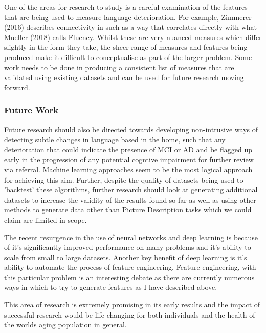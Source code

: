 \documentclass{article}
\begin{document}
\par
One of the areas for research to study is a careful examination of the features that are being used to measure language deterioration. For example, Zimmerer (2016) \cite{Zimmerer2016} describes connectivity in such as a way that correlates directly with what Mueller (2018) \cite{Mueller2018a} calls Fluency. Whilst these are very nuanced measures which differ slightly in the form they take, the sheer range of measures and features being produced make it difficult to conceptualise as part of the larger problem. Some work needs to be done in producing a consistent list of measures that are validated using existing datasets and can be used for future research moving forward. \newline
\par
\subsubsection{Future Work}
Future research should also be directed towards developing non-intrusive ways of detecting subtle changes in language based in the home, such that any deterioration that could indicate the presence of MCI or AD and be flagged up early in the progression of any potential cogntive impairment for further review via referral. Machine learning approaches seem to be the most logical approach for achieving this aim. Further, despite the quality of datasets being used to 'backtest' these algorithms, further research should look at generating additional datasets to increase the validity of the results found so far as well as using other methods to generate data other than Picture Description tasks which we could claim are limited in scope. \newline
\par
The recent resurgence in the use of neural networks and deep learning is because of it's significantly improved performance on many problems and it's ability to scale from small to large datasets. Another key benefit of deep learning is it's ability to automate the process of feature engineering. Feature engineering, with this particular problem is an interesting debate as there are currently numerous ways in which to try to generate features as I have described above.\newline
\par
This area of research is extremely promising in its early results and the impact of successful research would be life changing for both individuals and the health of the worlds aging population in general. \newline
\end{document}
